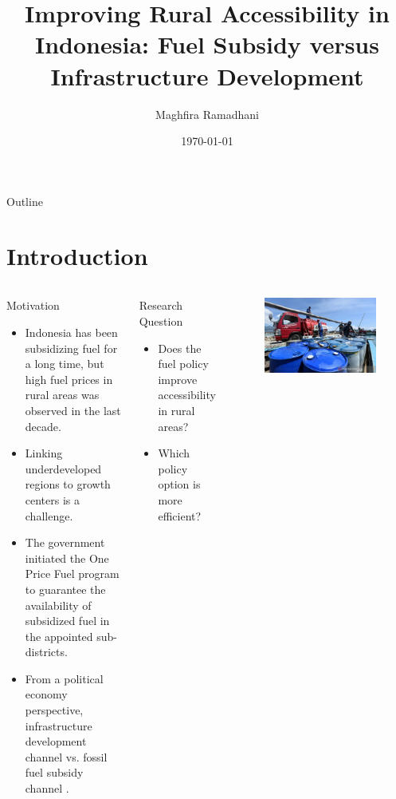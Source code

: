 \documentclass[
11pt,notheorems,compress,hyperref={pdfauthor=Maghfira Ramadhani}
]{beamer}
\title[
]{Improving Rural Accessibility in Indonesia: Fuel Subsidy versus Infrastructure Development}
\author[
]{
    Maghfira Ramadhani 
}
\institute{
    School of Economics, \\
    Georgia Institute of Technology}
\date{\today}
\begin{document}
{
\begin{frame}
  \titlepage
\end{frame}
}
\addtocounter{framenumber}{-1}


{
\begin{frame}{Outline}
    \tableofcontents%
\end{frame}
}
\section{Introduction}
\begin{frame}
\begin{columns}[T,onlytextwidth]
\begin{exampleblock}{Motivation}
\begin{itemize}
    \item Indonesia has been subsidizing fuel for a long time, but high fuel prices in rural areas was observed in the last decade. 
    \item Linking underdeveloped regions to growth centers is a challenge.
    \item The government initiated the One Price Fuel program to guarantee the availability of subsidized fuel in the appointed sub-districts. 
    \item From a political economy perspective, infrastructure development channel vs. fossil fuel subsidy channel \citep{ichsan_2022}.
\end{itemize}
\end{exampleblock}
\begin{exampleblock}{Research Question}
\begin{itemize}
    \item Does the fuel policy improve accessibility in rural areas? 
    \item Which policy option is more efficient?
\end{itemize}
\end{exampleblock}
    \begin{figure}[t]
        \includegraphics[scale=0.2]{Final_Project/image/bbm-satu-harga_1.jpg}

\end{figure}
\end{columns}
\end{frame}
\end{document}

